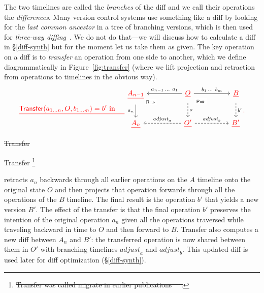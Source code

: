 \documentclass[english,submission]{programming}
\theoremstyle{definition}
\newcommand{\mathbox}[1]{\colorbox{black!10}{$#1$\phantom{i\hspace{-3.5pt}}}}
\providecommand{\DIFdel}[1]{{\protect\color{red}\sout{#1}}} %
\providecommand{\DIFdelbegin}{} %
\providecommand{\DIFdelend}{} %
\providecommand{\DIFdelFL}[1]{\DIFdel{#1}} %
\begin{document}
The two timelines are called the \textit{branches} of the diff and we call their operations the \textit{differences}. Many version control systems use something like a diff by looking for the \textit{last common ancestor} in a tree of branching versions, which is then used for \textit{three-way diffing}~\cite{diff3}. We do not do that---we will discuss how to calculate a diff in \S\ref{diff-synth} but for the moment let us take them as given. The key operation on a diff is to
\textit{transfer} an operation from one side to another, which we define diagrammatically in Figure~\ref{fig:transfer} (where we lift projection and retraction from operations to timelines in the obvious way).
\DIFdelbegin %
\[
\DIFdelFL{\textsf{Transfer}(a_{1\ldots n}, O, b_{1\ldots m}) = b' \textrm{ in }\quad
}\begin{tikzcd}[column sep = huge]
	\DIFdelFL{A_{n-1} }& \DIFdelFL{O }& \DIFdelFL{B }\\
	\DIFdelFL{A_n }& {\DIFdelFL{O'}} & {\DIFdelFL{B'}}
	\DIFdelFL{\arrow["{a_n}"', from=1-1, to=2-1]
	\arrow["{\textsf{R}\Rightarrow}"{description, pos=0.1}, draw=none, from=1-1, to=2-2]
	\arrow["{a_{n-1}\,\ldots\  a_1}"', from=1-2, to=1-1]
	\arrow["{b_1\,\ldots \  b_m}", from=1-2, to=1-3]
	\arrow["o", dashed, from=1-2, to=2-2]
	\arrow["{\textsf{P}\Rightarrow}"{description, pos=0.2}, draw=none, from=1-2, to=2-3]
	\arrow["{b'}", dashed, from=1-3, to=2-3]
	\arrow["{\mathit{adjust}_a}"', dashed, from=2-2, to=2-1]
	\arrow["{\mathit{adjust}_b}", dashed, from=2-2, to=2-3]
}\end{tikzcd}\DIFdelFL{}\]%
{%
\DIFdelFL{Transfer}}
\DIFdelend 

Transfer
\DIFdelbegin \footnote{\DIFdel{Transfer was called migrate in earlier publications~\mbox{%
\cite{edwards21, edwards22}}\hskip0pt%
.}} %
\addtocounter{footnote}{-1}%
\DIFdelend %
retracts \mathbox{a_n} backwards through all earlier operations on the \mathbox{A} timeline onto the original state \mathbox{O} and then projects that operation forwards through all the operations of the \mathbox{B} timeline. The final result is the operation \mathbox{b'} that yields a new version \mathbox{B'}. The effect of the transfer is that the final operation \mathbox{b'} preserves the intention of the original operation \mathbox{a_n} given all the operations traversed while traveling backward in time to \mathbox{O} and then forward to \mathbox{B}. Transfer also computes a new diff between \mathbox{A_n} and \mathbox{B'}: the transferred operation is now shared between them in \mathbox{O'} with branching timelines \mathbox{\mathit{adjust}_a} and \mathbox{\mathit{adjust}_b}. This updated diff is used later for diff optimization (\S\ref{diff-synth}).
\end{document}
